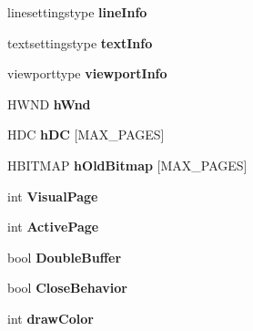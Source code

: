 \begin{DoxyCompactItemize}
\item 
linesettingstype {\bfseries line\+Info}\hypertarget{struct_window_data_a3ea7b942dd555e53344c70d2893f8846}{}\label{struct_window_data_a3ea7b942dd555e53344c70d2893f8846}

\item 
textsettingstype {\bfseries text\+Info}\hypertarget{struct_window_data_a5d8f5c3a13a7765b667e41b1d078805e}{}\label{struct_window_data_a5d8f5c3a13a7765b667e41b1d078805e}

\item 
viewporttype {\bfseries viewport\+Info}\hypertarget{struct_window_data_a8bf5681cbe4bcb00e6eace0dc96fbd64}{}\label{struct_window_data_a8bf5681cbe4bcb00e6eace0dc96fbd64}

\item 
H\+W\+ND {\bfseries h\+Wnd}\hypertarget{struct_window_data_afec4341c234519e145bac6f0e5edaa51}{}\label{struct_window_data_afec4341c234519e145bac6f0e5edaa51}

\item 
H\+DC {\bfseries h\+DC} \mbox{[}M\+A\+X\+\_\+\+P\+A\+G\+ES\mbox{]}\hypertarget{struct_window_data_a9e83dbddd21df200893986a5e837d76f}{}\label{struct_window_data_a9e83dbddd21df200893986a5e837d76f}

\item 
H\+B\+I\+T\+M\+AP {\bfseries h\+Old\+Bitmap} \mbox{[}M\+A\+X\+\_\+\+P\+A\+G\+ES\mbox{]}\hypertarget{struct_window_data_a8daa410172d9f88d0a17fa7d79bffb9b}{}\label{struct_window_data_a8daa410172d9f88d0a17fa7d79bffb9b}

\item 
int {\bfseries Visual\+Page}\hypertarget{struct_window_data_a5fd2b52094394c5e586883af84a588ef}{}\label{struct_window_data_a5fd2b52094394c5e586883af84a588ef}

\item 
int {\bfseries Active\+Page}\hypertarget{struct_window_data_ac9cf2adf6e9d014e44319dc383f951c4}{}\label{struct_window_data_ac9cf2adf6e9d014e44319dc383f951c4}

\item 
bool {\bfseries Double\+Buffer}\hypertarget{struct_window_data_a6155d54776578f956afa49c4aa3b4232}{}\label{struct_window_data_a6155d54776578f956afa49c4aa3b4232}

\item 
bool {\bfseries Close\+Behavior}\hypertarget{struct_window_data_ad5196cc921ca6323b2573c26069bb013}{}\label{struct_window_data_ad5196cc921ca6323b2573c26069bb013}

\item 
int {\bfseries draw\+Color}\hypertarget{struct_window_data_a6427be207311a8836f4bdc99621d0754}{}\label{struct_window_data_a6427be207311a8836f4bdc99621d0754}


\end{DoxyCompactItemize}
